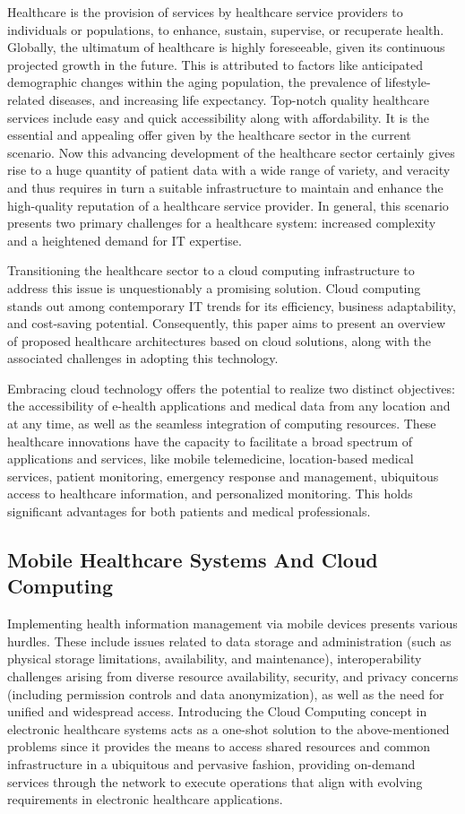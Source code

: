 \documentclass{article}
\begin{document}
Healthcare is the provision of services by healthcare service providers to individuals or populations, to enhance, sustain, supervise, or recuperate health.
Globally, the ultimatum of healthcare is highly foreseeable, given its continuous projected growth in the future. This is attributed to factors like anticipated demographic changes within the aging population, the prevalence of lifestyle-related diseases, and increasing life expectancy.
Top-notch quality healthcare services include easy and quick accessibility along with affordability. It is the essential and appealing offer given by the healthcare sector in the current scenario.
Now this advancing development of the healthcare sector certainly gives rise to a huge quantity of patient data with a wide range of variety, and veracity and thus requires in turn a suitable infrastructure to maintain and enhance the high-quality reputation of a healthcare service provider. In general, this scenario presents two primary challenges for a healthcare system: increased complexity and a heightened demand for IT expertise.

Transitioning the healthcare sector to a cloud computing infrastructure to address this issue is unquestionably a promising solution. Cloud computing stands out among contemporary IT trends for its efficiency, business adaptability, and cost-saving potential. Consequently, this paper aims to present an overview of proposed healthcare architectures based on cloud solutions, along with the associated challenges in adopting this technology.

Embracing cloud technology offers the potential to realize two distinct objectives: the accessibility of e-health applications and medical data from any location and at any time, as well as the seamless integration of computing resources. These healthcare innovations have the capacity to facilitate a broad spectrum of applications and services, like mobile telemedicine, location-based medical services, patient monitoring, emergency response and management, ubiquitous access to healthcare information, and personalized monitoring. This holds significant advantages for both patients and medical professionals.

\subsection{Mobile Healthcare Systems And Cloud Computing}
Implementing health information management via mobile devices presents various hurdles. These include issues related to data storage and administration (such as physical storage limitations, availability, and maintenance), interoperability challenges arising from diverse resource availability, security, and privacy concerns (including permission controls and data anonymization), as well as the need for unified and widespread access.
Introducing the Cloud Computing concept in electronic healthcare systems acts as a one-shot solution to the above-mentioned problems since it provides the means to access shared resources and common infrastructure in a ubiquitous and pervasive fashion, providing on-demand services through the network to execute operations that align with evolving requirements in electronic healthcare applications.
\end{document}
